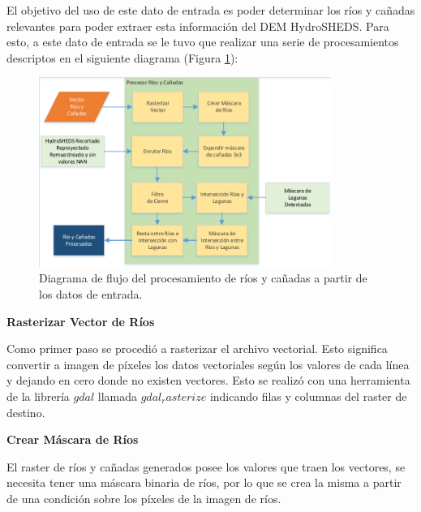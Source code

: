 \documentclass[10pt,a4paper, twoside]{report}
\begin{document}
El objetivo del uso de este dato de entrada es poder determinar los ríos y cañadas relevantes para poder extraer esta información del DEM HydroSHEDS. Para esto, a este dato de entrada se le tuvo que realizar una serie de procesamientos descriptos en el siguiente diagrama (Figura \ref{DiagramaRios}):

\begin{figure}[H]
   \centering      
   \includegraphics[width=0.85\textwidth]{imagenes/DiagramaRios.pdf}
 \caption{Diagrama de flujo del procesamiento de ríos y cañadas a partir de los datos de entrada.}
 \label{DiagramaRios}
\end{figure}	


\textbf{Rasterizar Vector de Ríos}

Como primer paso se procedió a rasterizar el archivo vectorial. Esto significa convertir a imagen de píxeles los datos vectoriales según los valores de cada línea y dejando en cero donde no existen vectores. Esto se realizó con una herramienta de la librería $gdal$ llamada $gdal_rasterize$ indicando filas y columnas del raster de destino.



\textbf{Crear Máscara de Ríos}

El raster de ríos y cañadas generados posee los valores que traen los vectores, se necesita tener una máscara binaria de ríos, por lo que se crea la misma a partir de una condición sobre los píxeles de la imagen de ríos. %
\end{document}
